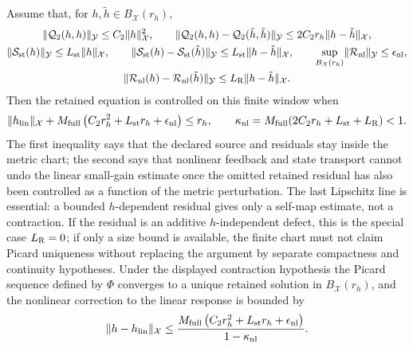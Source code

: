 \begin{controlledapproximation}
Assume that, for \(h,\tilde h\in B_{\mathcal X}(r_h)\),
\begin{equation}
\begin{gathered}
  \lVert\mathcal Q_2(h,h)\rVert_{\mathcal Y}
  \le
  C_2\lVert h\rVert_{\mathcal X}^2,
  \qquad
  \lVert
    \mathcal Q_2(h,h)-\mathcal Q_2(\tilde h,\tilde h)
  \rVert_{\mathcal Y}
  \le
  2C_2r_h\lVert h-\tilde h\rVert_{\mathcal X},
  \\
  \lVert\mathcal S_{\rm st}(h)\rVert_{\mathcal Y}
  \le
  L_{\rm st}\lVert h\rVert_{\mathcal X},
  \qquad
  \lVert
    \mathcal S_{\rm st}(h)-\mathcal S_{\rm st}(\tilde h)
  \rVert_{\mathcal Y}
  \le
  L_{\rm st}\lVert h-\tilde h\rVert_{\mathcal X},
  \qquad
  \sup_{B_{\mathcal X}(r_h)}
  \lVert\mathcal R_{\rm nl}\rVert_{\mathcal Y}
  \le
  \epsilon_{\rm nl},
  \\
  \lVert
    \mathcal R_{\rm nl}(h)-\mathcal R_{\rm nl}(\tilde h)
  \rVert_{\mathcal Y}
  \le
  L_{\rm R}\lVert h-\tilde h\rVert_{\mathcal X} .
\end{gathered}
  \label{eq:semiclassical-nonlinear-chart-bounds}
\end{equation}
Then the retained equation is controlled on this finite window when
\begin{equation}
  \lVert h_{\rm lin}\rVert_{\mathcal X}
  +
  M_{\rm full}
  \left(C_2r_h^2+L_{\rm st}r_h+\epsilon_{\rm nl}\right)
  \le r_h,
  \qquad
  \kappa_{\rm nl}
  =
  M_{\rm full}(2C_2r_h+L_{\rm st}+L_{\rm R})<1 .
  \label{eq:semiclassical-nonlinear-contraction-test}
\end{equation}
The first inequality says that the declared source and residuals stay inside
the metric chart; the second says that nonlinear feedback and state transport
cannot undo the linear small-gain estimate once the omitted retained residual
has also been controlled as a function of the metric perturbation.  The last
Lipschitz line is essential: a bounded \(h\)-dependent residual gives only a
self-map estimate, not a contraction.  If the residual is an additive
\(h\)-independent defect, this is the special case \(L_{\rm R}=0\); if only a
size bound is available, the finite chart must not claim Picard uniqueness
without replacing the argument by separate compactness and continuity
hypotheses.  Under the displayed contraction hypothesis the Picard sequence
defined by \(\Phi\) converges to a unique retained solution in
\(B_{\mathcal X}(r_h)\), and the nonlinear correction to the linear response is
bounded by
\begin{equation}
  \lVert h-h_{\rm lin}\rVert_{\mathcal X}
  \le
  \frac{
    M_{\rm full}\left(C_2r_h^2+L_{\rm st}r_h+\epsilon_{\rm nl}\right)
  }{1-\kappa_{\rm nl}} .
  \label{eq:semiclassical-nonlinear-correction-bound}
\end{equation}


\end{controlledapproximation}
